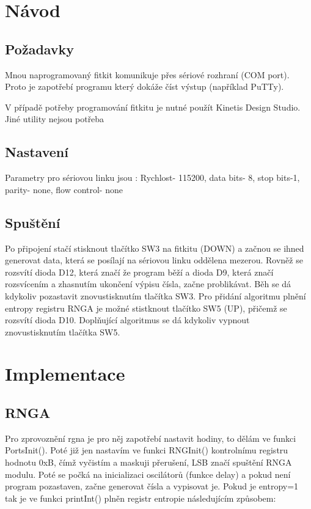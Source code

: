 \documentclass[a4paper]{article}
\begin{document}
\clearpage

\section{Návod}
\subsection{Požadavky}
Mnou naprogramovaný fitkit komunikuje přes sériové rozhraní (COM port). Proto je zapotřebí programu který dokáže číst výstup (například PuTTy).

\noindent V případě potřeby programování fitkitu je nutné použít Kinetis Design Studio. Jiné utility nejsou potřeba

\subsection{Nastavení}
\noindent Parametry pro sériovou linku jsou : Rychlost- 115200, data bits- 8, stop bits-1, parity- none, flow control- none
\subsection{Spuštění}
\noindent Po připojení stačí stisknout tlačítko SW3 na fitkitu (DOWN) a začnou se ihned generovat data, která se posílají na sériovou linku oddělena mezerou. Rovněž se rozsvítí dioda D12, která značí že program běží a dioda D9, která značí rozsvícením a zhasnutím ukončení výpisu čísla, začne problikávat. Běh se dá kdykoliv pozastavit znovustisknutím tlačítka SW3. Pro přidání algoritmu plnění entropy registru RNGA je možné stistknout tlačítko SW5 (UP), přičemž se rozsvítí dioda D10. Doplňující algoritmus se dá kdykoliv vypnout znovustisknutím tlačítka SW5.

\section{Implementace}
\subsection{RNGA}
Pro zprovoznění rgna je pro něj zapotřebí nastavit hodiny, to dělám ve funkci PortsInit(). Poté již jen nastavím ve funkci RNGInit() kontrolnímu registru hodnotu 0xB, čímž vyčistím a maskuji přerušení, LSB značí spuštění RNGA modulu. Poté se počká na inicializaci oscilátorů (funkce delay) a pokud není program pozastaven, začne generovat čísla a vypisovat je. Pokud je entropy=1 tak je ve funkci printInt() plněn registr entropie následujícím způsobem: 
\end{document}
